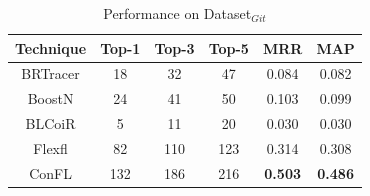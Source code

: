 \vspace{-8pt}
\begin{table}[H]\footnotesize
\caption{Performance on Dataset$_{Git}$} \label{table:overall}
\vspace{-8pt}
\begin{tabular}{c|ccc|cc}
\toprule
Technique & Top-1 & Top-3 & Top-5 & MRR & MAP \\ \hline
BRTracer  &  18     &  32     &  47     & 0.084    & 0.082     \\ 
BoostN    &   24    &  41     &   50    & 0.103    &  0.099   \\ 
BLCoiR  &  5     &  11    &  20     & 0.030    & 0.030     \\ \hline
Flexfl    &  82     &  110     &  123     &  0.314   & 0.308    \\ 
ConFL     &  132     &  186     &  216     & \textbf{0.503}    & \textbf{0.486}    \\ \bottomrule
\end{tabular}
\end{table}
\vspace{-8pt}

